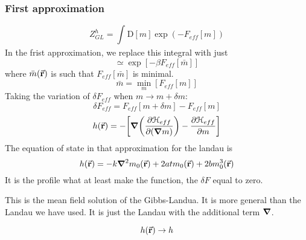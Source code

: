 \documentclass[../main/main.tex]{subfiles}
\begin{document}
\subsubsection{First approximation}
\begin{equation}
Z_{GL}^h = \int_{}^{} \text{D}[m] \exp (-F_{eff}[m])
\end{equation}
In the frist approximation, we replace this integral with just
\begin{equation}
  \simeq \exp [-\beta F_{eff} [\bar{m} ] ]
\end{equation}
where \( \bar{m}(\va{r})  \) is such that \( F_{eff} [\bar{m} ] \) is minimal.
\begin{equation}
  \bar{m} =  \min_{m} [F_{eff}[m]]
\end{equation}
Taking the variation of \( \delta F_{eff} \) when \( m \rightarrow m + \delta m \):
\begin{equation}
  \delta F_{eff} = F_{eff} [m+\delta m] - F_{eff} [m]
\end{equation}
\begin{equation}
  h (\va{r}) = - \qty[\grad \qty(\pdv{ \mathcal{H}_{eff}}{(\grad m)} ) - \pdv{\mathcal{H}_{eff}}{m}  ]
\end{equation}
The equation of state in that approximation for the landau is
\begin{equation}
  h (\va{r}) = - k \grad ^2 m_0(\va{r}) + 2 a t m_0 (\va{r})+ 2 b m_0^3(\va{r})
  \label{eq:17_1}
\end{equation}
It is the profile what at least make the function, the \( \delta F \) equal to zero.

This is the mean field solution of the Gibbs-Landua. It is more general than the Landau we have used. It is just the Landau with the additional term \( \grad  \).

\begin{equation}
  h(\va{r}) \rightarrow h
\end{equation}
\end{document}
